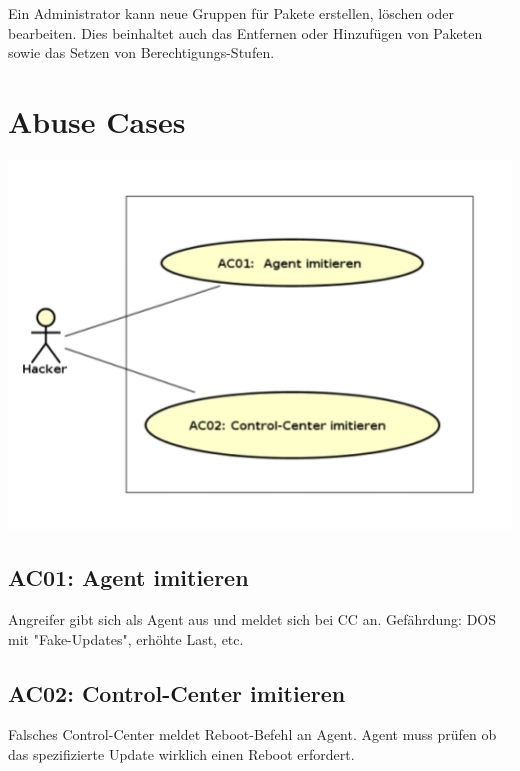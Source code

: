 Ein Administrator kann neue Gruppen für Pakete erstellen, löschen oder bearbeiten. Dies beinhaltet auch das Entfernen oder Hinzufügen von Paketen sowie das Setzen von Berechtigungs-Stufen.

\section{Abuse Cases}

\includegraphics[width=\textwidth]{files/AbuseCases_small}

\subsection{AC01: Agent imitieren}

Angreifer gibt sich als Agent aus und meldet sich bei CC an. Gefährdung: DOS mit "Fake-Updates", erhöhte Last, etc.

\subsection{AC02: Control-Center imitieren}

Falsches Control-Center meldet Reboot-Befehl an Agent. Agent muss prüfen ob das spezifizierte Update wirklich einen Reboot erfordert.